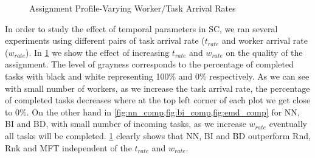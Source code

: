 \begin{figure}[h]
{    }
    \caption{\small{Assignment Profile-Varying Worker/Task Arrival Rates}}
    \label{fig:tw_rate}
\end{figure}

In order to study the effect of temporal parameters in SC, we ran several experiments using different pairs of task arrival rate ($t_{rate}$ and worker arrival rate ($w_{rate}$). In \cref{fig:tw_rate} we show the effect of increasing $t_{rate}$ and $w_{rate}$ on the quality of the assignment. The level of grayness corresponds to the percentage of completed tasks with black and white representing 100\% and 0\% respectively. As we can see with small number of workers, as we increase the task arrival rate, the percentage of completed tasks decreases where at the top left corner of each plot we get close to 0\%. On the other hand in \cref{fig:nn_comp,fig:bi_comp,fig:emd_comp} for NN, BI and BD, with small number of incoming tasks, as we increase $w_{rate}$ eventually all tasks will be completed. \cref{fig:tw_rate} clearly shows that NN, BI and BD outperform Rnd, Rnk and MFT independent of the $t_{rate}$ and $w_{rate}$.

